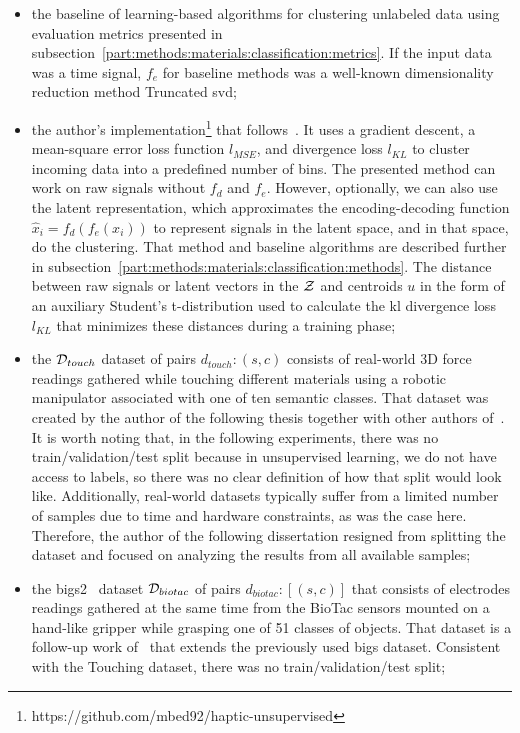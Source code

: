 \documentclass[a4paper, 10pt, twoside]{report}
\begin{document}
\begin{itemize}
    \item the baseline of learning-based algorithms for clustering unlabeled data using evaluation metrics presented in subsection~\ref{part:methods:materials:classification:metrics}. If the input data was a time signal, $f_{e}$ for baseline methods was a well-known dimensionality reduction method Truncated \acrfull{svd};
    
    \item the author's implementation\footnote{https://github.com/mbed92/haptic-unsupervised} that follows~\cite{DEC}. It uses a gradient descent, a mean-square error loss function $l_{MSE}$, and divergence loss $l_{KL}$ to cluster incoming data into a predefined number of bins. The presented method can work on raw signals without $f_d$ and $f_e$. However, optionally, we can also use the latent representation, which approximates the encoding-decoding function $\hat{x}_i = f_d(f_e(x_i))$ to represent signals in the latent space, and in that space, do the clustering. That method and baseline algorithms are described further in subsection~\ref{part:methods:materials:classification:methods}. The distance between raw signals or latent vectors in the ${\cal Z}$ and centroids $u$ in the form of an auxiliary Student's t-distribution used to calculate the \acrfull{kl} divergence loss $l_{KL}$ that minimizes these distances during a training phase;
    
    \item the ${\cal D}_{touch}$ dataset of pairs $d_{touch} \colon (s, c)$ consists of real-world 3D force readings gathered while touching different materials using a robotic manipulator associated with one of ten semantic classes. That dataset was created by the author of the following thesis together with other authors of~\cite{bednarek19}. It is worth noting that, in the following experiments, there was no train/validation/test split because in unsupervised learning, we do not have access to labels, so there was no clear definition of how that split would look like. Additionally, real-world datasets typically suffer from a limited number of samples due to time and hardware constraints, as was the case here. Therefore, the author of the following dissertation resigned from splitting the dataset and focused on analyzing the results from all available samples;
    
    \item the \acrfull{bigs2}~\cite{biotac2} dataset ${\cal D}_{biotac}$ of pairs $d_{biotac} \colon [(s, c)]$ that consists of electrodes readings gathered at the same time from the BioTac sensors mounted on a hand-like gripper while grasping one of 51 classes of objects. That dataset is a follow-up work of~\cite{bigs} that extends the previously used \acrshort{bigs} dataset. Consistent with the Touching dataset, there was no train/validation/test split;

\end{itemize}
\end{document}
